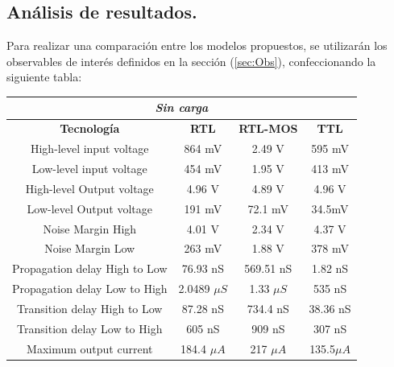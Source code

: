 \subsection{Análisis de resultados.}
Para realizar una comparación entre los modelos propuestos, se utilizarán los observables de interés definidos en la sección (\ref{sec:Obs}), confeccionando la siguiente tabla:
\begin{table}[H]
\centering
\begin{tabular}{c|ccc}
\hline
\multicolumn{4}{|c|}{\textit{Sin carga}}                                                                          \\ \hline
\multicolumn{1}{|c|}{\textbf{Tecnología}} & \textbf{RTL}   & \textbf{RTL-MOS} & \multicolumn{1}{c|}{\textbf{TTL}} \\ \hline
High-level input voltage                  & 864 mV         & 2.49 V           & 595 mV                            \\
Low-level input voltage                   & 454 mV         & 1.95 V           & 413 mV                            \\
High-level Output voltage                 & 4.96 V         & 4.89 V           & 4.96 V                            \\
Low-level Output voltage                  & 191 mV         & 72.1 mV          & 34.5mV                            \\
Noise Margin High                         & 4.01 V         & 2.34 V           & 4.37 V                            \\
Noise Margin Low                          & 263 mV         & 1.88 V           & 378 mV                            \\
Propagation delay High to Low             & 76.93 nS       & 569.51 nS        & 1.82 nS                           \\
Propagation delay Low to High             & 2.0489 $\mu S$ & 1.33 $\mu S$     & 535 nS                            \\
Transition delay High to Low              & 87.28 nS       & 734.4 nS         & 38.36 nS                          \\
Transition delay Low to High              & 605 nS         & 909 nS           & 307 nS                            \\
Maximum output current                    & 184.4  $\mu A$ &    217 $\mu A$              &                                  135.5$\mu A$ 	
\end{tabular}
\end{table}
